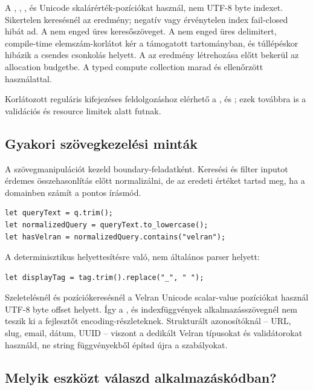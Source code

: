 A , , ,  és  Unicode skalárérték-pozíciókat használ, nem UTF-8 byte indexet. Sikertelen keresésnél  az eredmény; negatív vagy érvénytelen index fail-closed hibát ad. A  nem enged üres keresőszöveget. A  nem enged üres delimitert, compile-time elemszám-korlátot kér a támogatott tartományban, és túllépéskor hibázik a csendes csonkolás helyett. A  az eredmény létrehozása előtt bekerül az allocation budgetbe. A  typed compute collection marad  és ellenőrzött  használattal.

Korlátozott reguláris kifejezéses feldolgozáshoz elérhető a ,  és ; ezek továbbra is a validációs és resource limitek alatt futnak.

\subsection*{Gyakori szövegkezelési minták}

A szövegmanipulációt kezeld boundary-feladatként. Keresési és filter inputot érdemes összehasonlítás előtt normalizálni, de az eredeti értéket tartsd meg, ha a domainben számít a pontos írásmód.

\begin{lstlisting}[language=Velran]
let queryText = q.trim();
let normalizedQuery = queryText.to_lowercase();
let hasVelran = normalizedQuery.contains("velran");
\end{lstlisting}

A  determinisztikus helyettesítésre való, nem általános parser helyett:

\begin{lstlisting}[language=Velran]
let displayTag = tag.trim().replace("_", " ");
\end{lstlisting}

Szeletelésnél és pozíciókeresésnél a Velran Unicode scalar-value pozíciókat használ UTF-8 byte offset helyett. Így a ,  és indexfüggvények alkalmazásszövegnél nem teszik ki a fejlesztőt encoding-részleteknek. Strukturált azonosítóknál -- URL, slug, email, dátum, UUID -- viszont a dedikált Velran típusokat és validátorokat használd, ne string függvényekből építsd újra a szabályokat.

\subsection*{Melyik eszközt válaszd alkalmazáskódban?}

